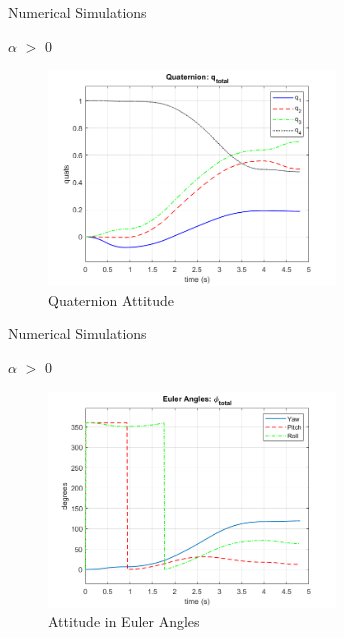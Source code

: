 \documentclass{beamer}
\begin{document}
\begin{frame}{Numerical Simulations}
	\begin{block}{$\alpha$ $>$ 0}
		
		\begin{figure}[H]
			\label{fig:quats_phi_total}
			\begin{center}
				\includegraphics[width=3in]{figures/alphaNot0/quats_phi_total.png}
			\end{center}
			\caption{Quaternion Attitude}
		\end{figure}
		
		
	\end{block}
\end{frame}
\begin{frame}{Numerical Simulations}
	\begin{block}{$\alpha$ $>$ 0}
		
		\begin{figure}[H]
			\label{fig:euler_ang_phi_total}
			\begin{center}
				\includegraphics[width=3in]{figures/alphaNot0/euler_ang_phi_total.png}
			\end{center}
			\caption{Attitude in Euler Angles}
		\end{figure}
		
	\end{block}
\end{frame}
\end{document}
